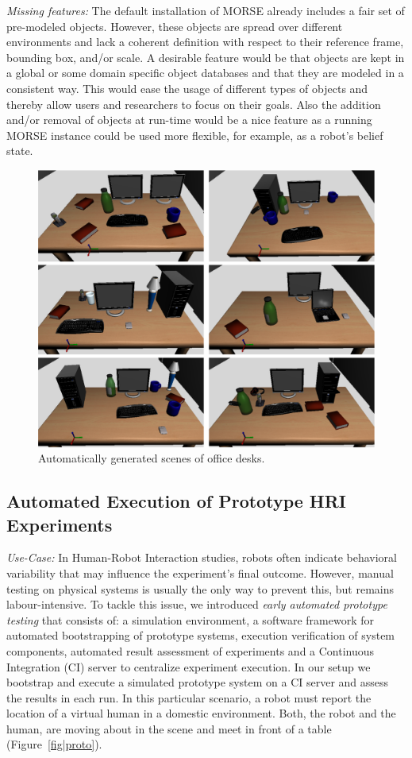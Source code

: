 \documentclass[conference]{IEEEtran}
\begin{document}
\emph{Missing features:} The default installation of MORSE already includes a
fair set of pre-modeled objects. However, these objects are spread over
different environments and lack a coherent definition with respect to their
reference frame, bounding box, and/or scale. A desirable feature would be that
objects are kept in a global or some domain specific object databases and that
they are modeled in a consistent way. This would ease the usage of different
types of objects and thereby allow users and researchers to focus on their
goals. Also the addition and/or removal of objects at run-time would be a nice
feature as a running MORSE instance could be used more flexible, for example,
as a robot's belief state.

\begin{figure}[tb]
  \centering
  \includegraphics[width=.9\columnwidth]{figs/scenes.png}
  \caption{Automatically generated scenes of office desks.}
  \label{fig:simulated-desktop-scenes}
\end{figure}


\subsection{Automated Execution of Prototype HRI Experiments}
\label{sc:ci}

\emph{Use-Case:} In Human-Robot Interaction studies, robots often indicate
behavioral variability that may influence the experiment's final outcome.
However, manual testing on physical systems is usually the only way to prevent
this, but remains labour-intensive. To tackle this issue, we introduced
\emph{early automated prototype testing} \cite{2645922} that consists of: a
simulation environment, a software framework for automated bootstrapping of
prototype systems, execution verification of system components, automated result
assessment of experiments \cite{2563606} and a Continuous Integration (CI)
\cite{duvall2007continuous} server to centralize experiment execution. In our
setup we bootstrap and execute a simulated prototype system on a CI server and
assess the results in each run. In this particular scenario, a robot must report
the location of a virtual human in a domestic environment. Both, the robot and
the human, are moving about in the scene and meet in front of a table
(Figure~\ref{fig|proto}).
\end{document}

